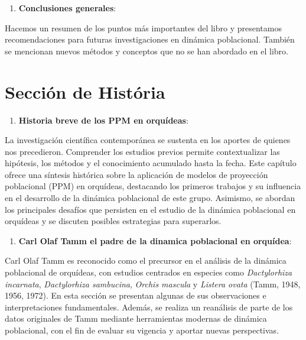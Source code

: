 \documentclass[
  12pt,
  letterpaper,
]{book}
\providecommand{\tightlist}{%
  \setlength{\itemsep}{0pt}\setlength{\parskip}{0pt}}\usepackage{longtable,booktabs,array}
\begin{document}
\begin{enumerate}
\def\labelenumi{\arabic{enumi}.}
\setcounter{enumi}{18}
\tightlist
\item
  \textbf{Conclusiones generales}:
\end{enumerate}

Hacemos un resumen de los puntos más importantes del libro y presentamos
recomendaciones para futuras investigaciones en dinámica poblacional.
También se mencionan nuevos métodos y conceptos que no se han abordado
en el libro.

\section{Sección de História}\label{secciuxf3n-de-histuxf3ria}

\begin{enumerate}
\def\labelenumi{\arabic{enumi}.}
\tightlist
\item
  \textbf{Historia breve de los PPM en orquídeas}:
\end{enumerate}

La investigación científica contemporánea se sustenta en los aportes de
quienes nos precedieron. Comprender los estudios previos permite
contextualizar las hipótesis, los métodos y el conocimiento acumulado
hasta la fecha. Este capítulo ofrece una síntesis histórica sobre la
aplicación de modelos de proyección poblacional (PPM) en orquídeas,
destacando los primeros trabajos y su influencia en el desarrollo de la
dinámica poblacional de este grupo. Asimismo, se abordan los principales
desafíos que persisten en el estudio de la dinámica poblacional en
orquídeas y se discuten posibles estrategias para superarlos.

\begin{enumerate}
\def\labelenumi{\arabic{enumi}.}
\setcounter{enumi}{1}
\tightlist
\item
  \textbf{Carl Olaf Tamm el padre de la dinamica poblacional en
  orquídea}:
\end{enumerate}

Carl Olaf Tamm es reconocido como el precursor en el análisis de la
dinámica poblacional de orquídeas, con estudios centrados en especies
como \emph{Dactylorhiza incarnata}, \emph{Dactylorhiza sambucina},
\emph{Orchis mascula} y \emph{Listera ovata} (Tamm, 1948, 1956, 1972).
En esta sección se presentan algunas de sus observaciones e
interpretaciones fundamentales. Además, se realiza un reanálisis de
parte de los datos originales de Tamm mediante herramientas modernas de
dinámica poblacional, con el fin de evaluar su vigencia y aportar nuevas
perspectivas.
\end{document}
